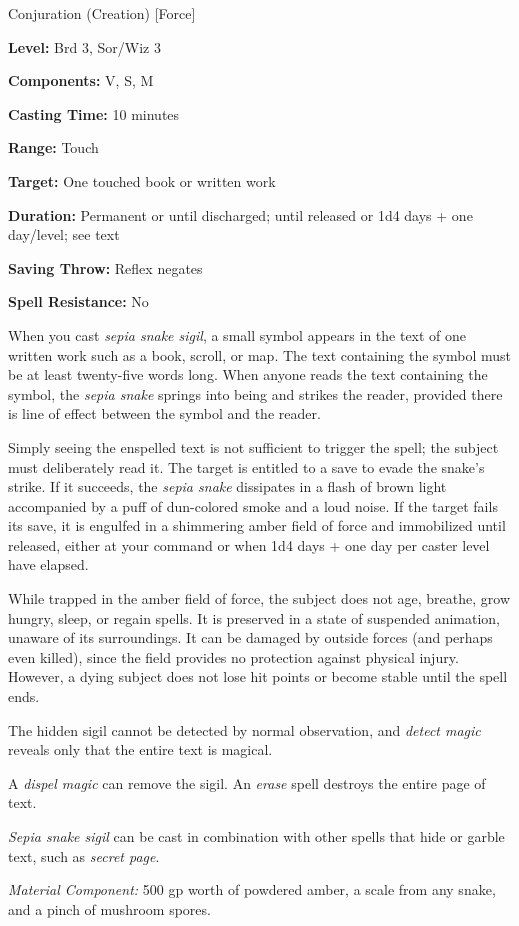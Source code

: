 
Conjuration (Creation) [Force]

\textbf{Level:} Brd 3, Sor/Wiz 3

\textbf{Components:} V, S, M

\textbf{Casting Time:} 10 minutes

\textbf{Range:} Touch

\textbf{Target:} One touched book or written work

\textbf{Duration:} Permanent or until discharged; until released or 1d4 days + 
one day/level; see text

\textbf{Saving Throw:} Reflex negates

\textbf{Spell Resistance:} No

When you cast \textit{sepia snake sigil}, a small symbol appears in the text of 
one written work such as a book, scroll, or map. The text containing the symbol 
must be at least twenty-five words long. When anyone reads the text containing 
the symbol, the \textit{sepia snake} springs into being and strikes the reader, 
provided there is line of effect between the symbol and the reader.

Simply seeing the enspelled text is not sufficient to trigger the spell; the subject 
must deliberately read it. The target is entitled to a save to evade the snake's 
strike. If it succeeds, the \textit{sepia snake} dissipates in a flash of brown 
light accompanied by a puff of dun-colored smoke and a loud noise. If the target 
fails its save, it is engulfed in a shimmering amber field of force and immobilized 
until released, either at your command or when 1d4 days + one day per caster level 
have elapsed.

While trapped in the amber field of force, the subject does not age, breathe, grow 
hungry, sleep, or regain spells. It is preserved in a state of suspended animation, 
unaware of its surroundings. It can be damaged by outside forces (and perhaps even 
killed), since the field provides no protection against physical injury. However, 
a dying subject does not lose hit points or become stable until the spell ends.

The hidden sigil cannot be detected by normal observation, and \textit{detect magic 
}reveals only that the entire text is magical.

A \textit{dispel magic} can remove the sigil. An \textit{erase} spell destroys 
the entire page of text.

\textit{Sepia snake sigil} can be cast in combination with other spells that hide 
or garble text, such as \textit{secret page}.

\textit{Material Component:} 500 gp worth of powdered amber, a scale from any snake, 
and a pinch of mushroom spores.

